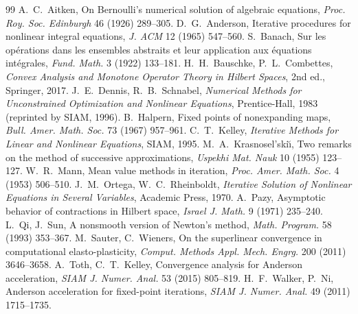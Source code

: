 \begin{chapterbib}{99}
 A.~C.~Aitken, On Bernoulli's numerical solution of algebraic equations, \emph{Proc. Roy. Soc. Edinburgh} 46 (1926) 289--305.
 D.~G.~Anderson, Iterative procedures for nonlinear integral equations, \emph{J. ACM} 12 (1965) 547--560.
 S.~Banach, Sur les op\'erations dans les ensembles abstraits et leur application aux \'equations int\'egrales, \emph{Fund. Math.} 3 (1922) 133--181.
 H.~H.~Bauschke, P.~L.~Combettes, \emph{Convex Analysis and Monotone Operator Theory in Hilbert Spaces}, 2nd ed., Springer, 2017.
 J.~E.~Dennis, R.~B.~Schnabel, \emph{Numerical Methods for Unconstrained Optimization and Nonlinear Equations}, Prentice-Hall, 1983 (reprinted by SIAM, 1996).
 B.~Halpern, Fixed points of nonexpanding maps, \emph{Bull. Amer. Math. Soc.} 73 (1967) 957--961.
 C.~T.~Kelley, \emph{Iterative Methods for Linear and Nonlinear Equations}, SIAM, 1995.
 M.~A.~Krasnosel'ski\u{\i}, Two remarks on the method of successive approximations, \emph{Uspekhi Mat. Nauk} 10 (1955) 123--127.
 W.~R.~Mann, Mean value methods in iteration, \emph{Proc. Amer. Math. Soc.} 4 (1953) 506--510.
 J.~M.~Ortega, W.~C.~Rheinboldt, \emph{Iterative Solution of Nonlinear Equations in Several Variables}, Academic Press, 1970.
 A.~Pazy, Asymptotic behavior of contractions in Hilbert space, \emph{Israel J. Math.} 9 (1971) 235--240.
 L.~Qi, J.~Sun, A nonsmooth version of Newton's method, \emph{Math. Program.} 58 (1993) 353--367.
 M.~Sauter, C.~Wieners, On the superlinear convergence in computational elasto-plasticity, \emph{Comput. Methods Appl. Mech. Engrg.} 200 (2011) 3646--3658.
 A.~Toth, C.~T.~Kelley, Convergence analysis for Anderson acceleration, \emph{SIAM J. Numer. Anal.} 53 (2015) 805--819.
 H.~F.~Walker, P.~Ni, Anderson acceleration for fixed-point iterations, \emph{SIAM J. Numer. Anal.} 49 (2011) 1715--1735.
\end{chapterbib}
